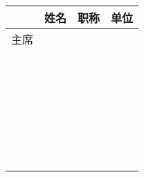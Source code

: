
\begin{table}[!ht]
    \centering
    \renewcommand\arraystretch{2.4}
    \begin{tabular}{|>{\centering\arraybackslash\sihao}m{3em}|>{\centering\arraybackslash\sihao}m{6em}|>{\centering\arraybackslash\sihao}m{6em}|>{\centering\arraybackslash\sihao}m{18em}|}
    \hline
        ~ & \bf{姓名} & \bf{职称} & \bf{单位} \\ \hline
         主席 & ~ & ~ & ~ \\ \hline
        \multirow{6}{*}{委员} & ~ & ~ & ~ \\ \cline{2-4}
         & ~ & ~ & ~ \\ \cline{2-4}
         & ~ & ~ & ~ \\ \cline{2-4}
         & ~ & ~ & ~ \\ \cline{2-4}
         & ~ & ~ & ~ \\ \cline{2-4}
         & ~ & ~ & ~ \\ \hline
    \end{tabular}
\end{table}
